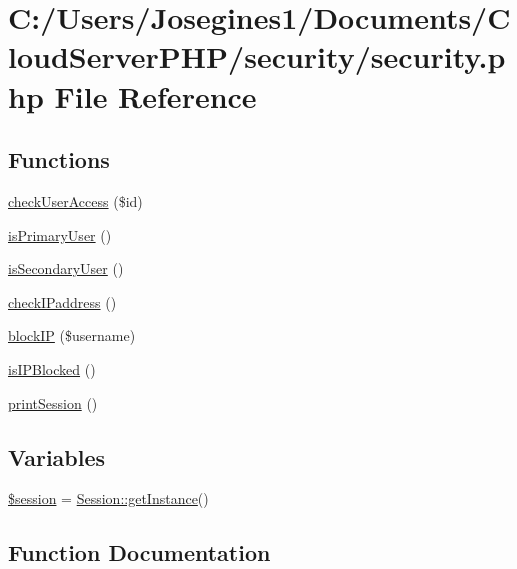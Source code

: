 \hypertarget{security_8php}{}\section{C\+:/\+Users/\+Josegines1/\+Documents/\+Cloud\+Server\+P\+H\+P/security/security.php File Reference}
\label{security_8php}
\subsection*{Functions}
\begin{DoxyCompactItemize}
\item 
\mbox{\hyperlink{security_8php_a4307f3ceb1b77b46b43f3f1b47351d58}{check\+User\+Access}} (\$id)
\item 
\mbox{\hyperlink{security_8php_aa5ecb17c2198bf80eebdb9c160d72166}{is\+Primary\+User}} ()
\item 
\mbox{\hyperlink{security_8php_a3e679550eb1b386501ee1cfa526276a1}{is\+Secondary\+User}} ()
\item 
\mbox{\hyperlink{security_8php_ae02fcab617b478cba90c4bcc17b81602}{check\+I\+Paddress}} ()
\item 
\mbox{\hyperlink{security_8php_a580c7a2514d6f09cec983a3a8c8e414a}{block\+IP}} (\$username)
\item 
\mbox{\hyperlink{security_8php_abddcb605984b484876498005966cc86d}{is\+I\+P\+Blocked}} ()
\item 
\mbox{\hyperlink{security_8php_af2faa3bf585ce4fde3886e3f231b8827}{print\+Session}} ()
\end{DoxyCompactItemize}
\subsection*{Variables}
\begin{DoxyCompactItemize}
\item 
\mbox{\hyperlink{security_8php_abefb3c26429d514777313e9a63d7cbac}{\$session}} = \mbox{\hyperlink{class_session_ac93fbec81f07e5d15f80db907e63dc10}{Session\+::get\+Instance}}()
\end{DoxyCompactItemize}


\subsection{Function Documentation}
\mbox{\label{security_8php_a580c7a2514d6f09cec983a3a8c8e414a}} 
